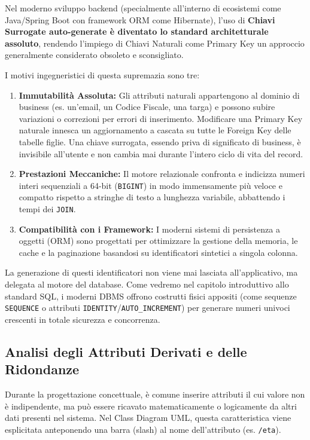 \begin{tip}
Nel moderno sviluppo backend (specialmente all'interno di ecosistemi come Java/Spring Boot con framework ORM come Hibernate), l'uso di \textbf{Chiavi Surrogate auto-generate è diventato lo standard architetturale assoluto}, rendendo l'impiego di Chiavi Naturali come Primary Key un approccio generalmente considerato obsoleto e sconsigliato.

I motivi ingegneristici di questa supremazia sono tre:
\begin{enumerate}
    \item \textbf{Immutabilità Assoluta:} Gli attributi naturali appartengono al dominio di business (es. un'email, un Codice Fiscale, una targa) e possono subire variazioni o correzioni per errori di inserimento. Modificare una Primary Key naturale innesca un aggiornamento a cascata su tutte le Foreign Key delle tabelle figlie. Una chiave surrogata, essendo priva di significato di business, è invisibile all'utente e non cambia mai durante l'intero ciclo di vita del record.
    \item \textbf{Prestazioni Meccaniche:} Il motore relazionale confronta e indicizza numeri interi sequenziali a 64-bit (\texttt{BIGINT}) in modo immensamente più veloce e compatto rispetto a stringhe di testo a lunghezza variabile, abbattendo i tempi dei \texttt{JOIN}.
    \item \textbf{Compatibilità con i Framework:} I moderni sistemi di persistenza a oggetti (ORM) sono progettati per ottimizzare la gestione della memoria, le cache e la paginazione basandosi su identificatori sintetici a singola colonna.
\end{enumerate}

La generazione di questi identificatori non viene mai lasciata all'applicativo, ma delegata al motore del database. Come vedremo nel capitolo introduttivo allo standard SQL, i moderni DBMS offrono costrutti fisici appositi (come sequenze \texttt{SEQUENCE} o attributi \texttt{IDENTITY}/\texttt{AUTO\_INCREMENT}) per generare numeri univoci crescenti in totale sicurezza e concorrenza.
\end{tip}

\subsection{Analisi degli Attributi Derivati e delle Ridondanze}

Durante la progettazione concettuale, è comune inserire attributi il cui valore non è indipendente, ma può essere ricavato matematicamente o logicamente da altri dati presenti nel sistema. Nel Class Diagram UML, questa caratteristica viene esplicitata anteponendo una barra (slash) al nome dell'attributo (es. \texttt{/eta}).

